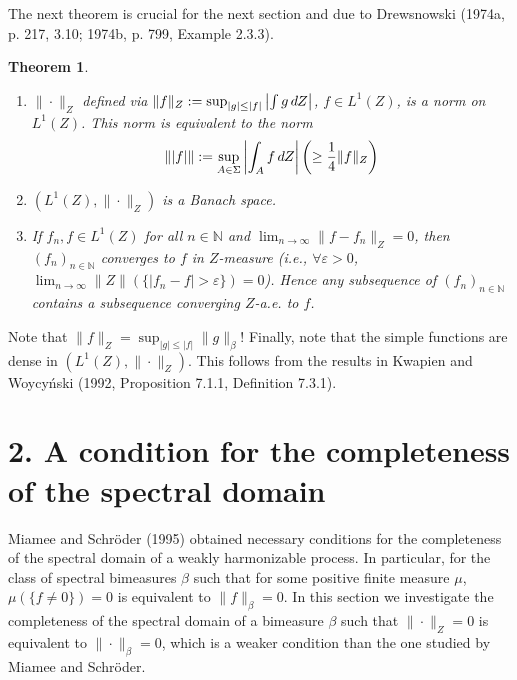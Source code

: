 \documentclass{article}
\newcommand{\assign}{:=}
\newcommand{\cdummy}{\cdot}
\newcommand{\tmdummy}{$\mbox{}$}
\newenvironment{enumeratealpha}{\begin{enumerate}[a{\textup{)}}] }{\end{enumerate}}
{\theorembodyfont{\rmfamily}\newtheorem{remark}{Remark}}
\newtheorem{theorem}{Theorem}
\begin{document}
The next theorem is crucial for the next section and due to Drewsnowski
(1974a, p. 217, 3.10; 1974b, p. 799, Example 2.3.3).

\begin{theorem}
  {\tmdummy}
  
  \begin{enumeratealpha}
    \item $\| \cdummy \|_Z$ defined via $\|f\|_Z \assign \sup_{|g| \leq |f|}
    \left| \int g \hspace{0.17em} dZ \right|$, $f \in L^1 (Z)$, is a norm on
    $L^1 (Z)$. This norm is equivalent to the norm
    \begin{equation}
      \lVert |f| \rVert \assign \sup_{A \in \Sigma} \left| \int_A f
      \hspace{0.17em} dZ \right|  \left( \geq \frac{1}{4} \|f\|_Z \right)
    \end{equation}
    \item $(L^1 (Z), \| \cdot \|_Z)$ is a Banach space.
    
    \item If $f_n, f \in L^1 (Z)$ for all $n \in \mathbb{N}$ and $\lim_{n \to
    \infty} \|f - f_n \|_Z = 0$, then $(f_n)_{n \in \mathbb{N}}$ converges to
    $f$ in $Z$-measure (i.e., $\forall \varepsilon > 0$, $\lim_{n \to \infty}
    \|Z\| (\{|f_n - f| > \varepsilon\}) = 0$). Hence any subsequence of
    $(f_n)_{n \in \mathbb{N}}$ contains a subsequence converging $Z$-a.e. to
    $f$.
  \end{enumeratealpha}
\end{theorem}

Note that $\|f\|_Z = \sup_{|g| \leq |f|} \|g\|_{\beta}$! Finally, note that
the simple functions are dense in $(L^1 (Z), \| \cdot \|_Z)$. This follows
from the results in Kwapien and Woycy{\'n}ski (1992, Proposition 7.1.1,
Definition 7.3.1).

\section*{2. A condition for the completeness of the spectral domain}

Miamee and Schr{\"o}der (1995) obtained necessary conditions for the
completeness of the spectral domain of a weakly harmonizable process. In
particular, for the class of spectral bimeasures $\beta$ such that for some
positive finite measure $\mu$, $\mu (\{f \neq 0\}) = 0$ is equivalent to
$\|f\|_{\beta} = 0$. In this section we investigate the completeness of the
spectral domain of a bimeasure $\beta$ such that $\| \cdummy \|_Z = 0$ is
equivalent to $\| \cdummy \|_{\beta} = 0$, which is a weaker condition than
the one studied by Miamee and Schr{\"o}der.
\end{document}
